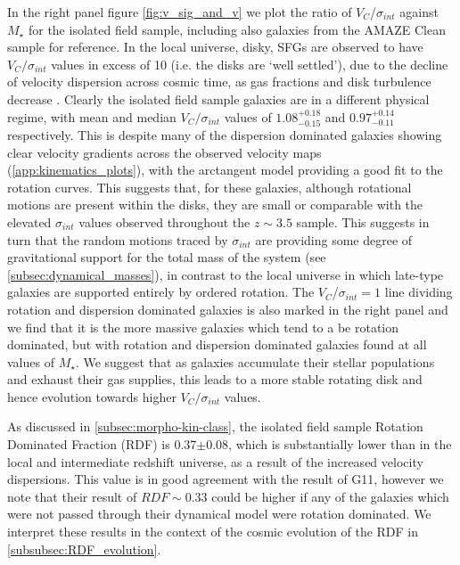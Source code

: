 \documentclass[fleqn,usenatbib]{mn2e}
\begin{document}
In the right panel figure \ref{fig:v_sig_and_v} we plot the ratio of $V_{C}$/$\sigma_{int}$ against $M_{\star}$ for the isolated field sample, including also galaxies from the AMAZE Clean sample for reference.
In the local universe, disky, SFGs are observed to have $V_{C}/\sigma_{int}$ values in excess of 10 (i.e. the disks are `well settled'), due to the decline of velocity dispersion across cosmic time, as gas fractions and disk turbulence decrease \citep[e.g.][]{Epinat2008,Epinat2008a}.
Clearly the isolated field sample galaxies are in a different physical regime, with mean and median $V_{C}/\sigma_{int}$ values of $1.08^{+0.18}_{-0.15}$ and $0.97^{+0.14}_{-0.11}$ respectively.
This is despite many of the dispersion dominated galaxies showing clear velocity gradients across the observed velocity maps (\cref{app:kinematics_plots}), with the arctangent model providing a good fit to the rotation curves.
This suggests that, for these galaxies, although rotational motions are present within the disks, they are small or comparable with the elevated $\sigma_{int}$ values observed throughout the $z \sim 3.5$ sample.
This suggests in turn that the random motions traced by $\sigma_{int}$ are providing some degree of gravitational support for the total mass of the system (see \cref{subsec:dynamical_masses}), in contrast to the local universe in which late-type galaxies are supported entirely by ordered rotation.
The $V_{C}$/$\sigma_{int}=1$ line dividing rotation and dispersion dominated galaxies is also marked in the right panel and we find that it is the more massive galaxies which tend to a be rotation dominated, but with rotation and dispersion dominated galaxies found at all values of $M_{\star}$.
We suggest that as galaxies accumulate their stellar populations and exhaust their gas supplies, this leads to a more stable rotating disk and hence evolution towards higher $V_{C}/\sigma_{int}$ values.


As discussed in \cref{subsec:morpho-kin-class}, the isolated field sample Rotation Dominated Fraction (RDF) is 0.37$\pm0.08$, which is substantially lower than in the local and intermediate redshift universe, as a result of the increased velocity dispersions.
This value is in good agreement with the result of G11, however we note that their result of $RDF \sim 0.33$ could be higher if any of the galaxies which were not passed through their dynamical model were rotation dominated.
We interpret these results in the context of the cosmic evolution of the RDF in \cref{subsubsec:RDF_evolution}.\\
\end{document}

